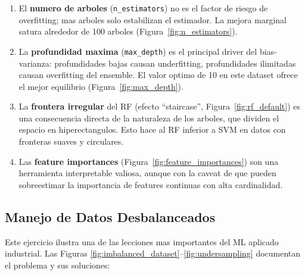 \documentclass[12pt,a4paper]{article}
\begin{document}
\begin{enumerate}[label=\textbf{\arabic*.}]
  \item El \textbf{numero de arboles} (\texttt{n\_estimators}) no es el factor de riesgo de
    overfitting; mas arboles solo estabilizan el estimador. La mejora marginal satura alrededor
    de 100 arboles (Figura~\ref{fig:n_estimators}).

  \item La \textbf{profundidad maxima} (\texttt{max\_depth}) es el principal driver del
    bias-varianza: profundidades bajas causan underfitting, profundidades ilimitadas causan
    overfitting del ensemble. El valor optimo de 10 en este dataset ofrece el mejor equilibrio
    (Figura~\ref{fig:max_depth}).

  \item La \textbf{frontera irregular} del RF (efecto ``staircase'', Figura~\ref{fig:rf_default})
    es una consecuencia directa de la naturaleza de los arboles, que dividen el espacio en
    hiperectangulos. Esto hace al RF inferior a SVM en datos con fronteras suaves y circulares.

  \item Las \textbf{feature importances} (Figura~\ref{fig:feature_importances}) son una
    herramienta interpretable valiosa, aunque con la caveat de que pueden sobreestimar la
    importancia de features continuas con alta cardinalidad.
\end{enumerate}

\subsection{Manejo de Datos Desbalanceados}

Este ejercicio ilustra una de las lecciones mas importantes del ML aplicado industrial. Las
Figuras \ref{fig:imbalanced_dataset}--\ref{fig:undersampling} documentan el problema y sus
soluciones:
\end{document}
